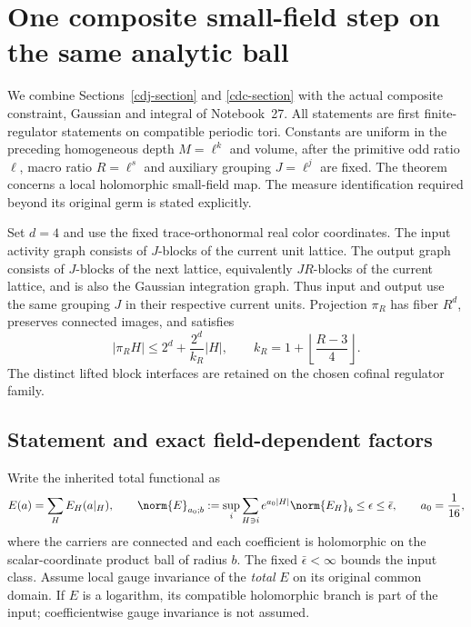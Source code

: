 \section{One composite small-field step on the same analytic ball}
\label{cdm-section}

We combine Sections~\ref{cdj-section} and \ref{cdc-section} with the
actual composite constraint, Gaussian and integral of Notebook~27.
All statements are first finite-regulator statements on compatible
periodic tori. Constants are uniform in the preceding homogeneous
depth $M=\ell^k$ and volume, after the primitive odd ratio $\ell$,
macro ratio $R=\ell^s$ and auxiliary grouping $J=\ell^j$ are fixed.
The theorem concerns a local holomorphic small-field map. The measure
identification required beyond its original germ is stated explicitly.

Set $d=4$ and use the fixed trace-orthonormal real color coordinates.
The input activity graph consists of $J$-blocks of the current
unit lattice. The output graph consists of $J$-blocks of the next
lattice, equivalently $JR$-blocks of the current lattice, and is
also the Gaussian integration graph. Thus input and output use
the same grouping $J$ in their respective current units. Projection
$\pi_R$ has fiber $R^d$, preserves connected images, and satisfies
\begin{equation}
 |\pi_RH|\le 2^d+\frac{2^d}{k_R}|H|,
 \qquad k_R=1+\left\lfloor\frac{R-3}{4}\right\rfloor.
 \label{cdm-compression}
\end{equation}
The distinct lifted block interfaces are retained on the chosen
cofinal regulator family.

\subsection{Statement and exact field-dependent factors}
\label{cdm-statement-section}

Write the inherited total functional as
\begin{equation}
 E(a)=\sum_H E_H(a|_H),\qquad
 \norm{E}_{a_0;b}:=
 \sup_i\sum_{H\ni i}e^{a_0|H|}\norm{E_H}_b
 \le\epsilon\le\bar\epsilon,\qquad a_0=\frac1{16},
 \label{cdm-input}
\end{equation}
where the carriers are connected and each coefficient is holomorphic
on the scalar-coordinate product ball of radius $b$. The fixed
$\bar\epsilon<\infty$ bounds the input class. Assume local gauge
invariance of the \emph{total} $E$ on its original common domain.
If $E$ is a logarithm, its compatible holomorphic branch is part
of the input; coefficientwise gauge invariance is not assumed.


